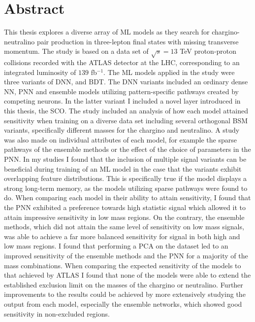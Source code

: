 \chapter*{Abstract} 
This thesis explores a diverse array of \acf{ML} models as they search for chargino-neutralino pair production in 
three-lepton final states with missing transverse momentum. The study is based on a data set of $\sqrt{s} = 13$ TeV proton-proton
collisions recorded with the \acs{ATLAS} detector at the \acs{LHC}, corresponding to an integrated luminosity of $139$ fb$^{-1}$. The \acs{ML} 
models applied in the study were three variants of \acf{DNN}, and \acf{BDT}. The \acs{DNN} variants included an ordinary 
dense \acf{NN}, \acf{PNN} and ensemble models utilizing pattern-specific pathways created by competing neurons. In the latter variant I 
included a novel layer introduced in this thesis, the \acf{SCO}. The study included an analysis of how each model attained sensitivity 
when training on a diverse data set including several orthogonal \acf{BSM} variants, specifically different masses for the chargino and neutralino. 
A study was also made on individual attributes of each model, for example the sparse pathways of the ensemble methods or the effect 
of the choice of parameters in the \acs{PNN}. In my studies I found that the inclusion of multiple signal variants can be beneficial during 
training of an \ac{ML} model in the case that the variants exhibit overlapping feature distributions. This is specifically true if 
the model displays a strong long-term memory, as the models utilizing sparse pathways were found to do. When comparing each 
model in their ability to attain sensitivity, I found that the \acs{PNN} exhibited a preference towards high statistic signal which allowed it 
to attain impressive sensitivity in low mass regions. On the contrary, the ensemble methods, which did not attain the same level of sensitivity 
on low mass signals, was able to achieve a far more balanced sensitivity for signal in both high and low mass regions. I found that performing a 
\acf{PCA} on the dataset led to an improved sensitivity of the ensemble methods and the \ac{PNN} for a majority of the mass combinations.
When comparing the expected sensitivity of the models to that achieved by \acs{ATLAS} I found that none of the models were able to extend the established 
exclusion limit on the masses of the chargino or neutralino. Further improvements to the results could be achieved by more extensively studying the 
output from each model, especially the ensemble networks, which showed good sensitivity in non-excluded regions.